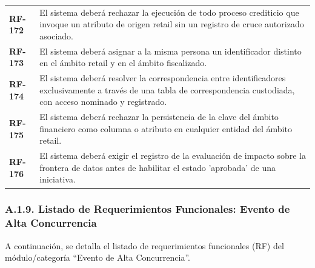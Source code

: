 \documentclass[11pt]{article}
\begin{document}
\begin{longtable}[]{@{}
  >{\raggedright\arraybackslash}p{}
  >{\raggedright\arraybackslash}p{}@{}}
\addlinespace[2pt]
\textbf{RF-172} & El sistema deberá rechazar la ejecución de todo proceso crediticio que invoque un atributo de origen retail sin un registro de cruce autorizado asociado. \\
\addlinespace[2pt]
\textbf{RF-173} & El sistema deberá asignar a la misma persona un identificador distinto en el ámbito retail y en el ámbito fiscalizado. \\
\addlinespace[2pt]
\textbf{RF-174} & El sistema deberá resolver la correspondencia entre identificadores exclusivamente a través de una tabla de correspondencia custodiada, con acceso nominado y registrado. \\
\addlinespace[2pt]
\textbf{RF-175} & El sistema deberá rechazar la persistencia de la clave del ámbito financiero como columna o atributo en cualquier entidad del ámbito retail. \\
\addlinespace[2pt]
\textbf{RF-176} & El sistema deberá exigir el registro de la evaluación de impacto sobre la frontera de datos antes de habilitar el estado 'aprobada' de una iniciativa. \\
\end{longtable}

\subsubsection{A.1.9. Listado de Requerimientos Funcionales: Evento de Alta Concurrencia}\label{a-1-9-listado-de-requerimientos-funcionales-evento-de-alta-concurrencia}

A continuación, se detalla el listado de requerimientos funcionales (RF) del módulo/categoría ``Evento de Alta Concurrencia''.
\end{document}
